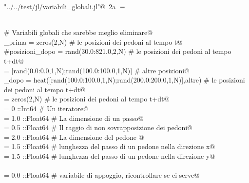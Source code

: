 \documentclass[]{article}
\begin{document}
\begin{flushleft} \small
\begin{minipage}{\linewidth} \label{scrap2}
\protect{}\verb@"../../test/jl/variabili_globali.jl"@\nobreak\ {\footnotesize 2a }$\equiv$
\vspace{-1ex}
\begin{list}{}{} \item
\mbox{}\verb@@\\
\mbox{}\verb@# Variabili globali che sarebbe meglio eliminare@\\
\mbox{}\verb@posizioni_prima = zeros(2,N)           # le posizioni dei pedoni al tempo t@\\
\mbox{}\verb@#posizioni_dopo = rand(30.0:821.0,2,N)    # le posizioni dei pedoni al tempo t+dt@\\
\mbox{}\verb@altre = [rand(0.0:0.0,1,N);rand(100.0:100.0,1,N)] # altre posizioni@\\
\mbox{}\verb@posizioni_dopo = hcat([rand(100.0:100.0,1,N);rand(200.0:200.0,1,N)],altre) # le posizioni dei pedoni al tempo t+dt@\\
\mbox{}\verb@velocita = zeros(2,N)                  # le posizioni dei pedoni al tempo t+dt@\\
\mbox{}\verb@k = 0 ::Int64                       # Un iteratore@\\
\mbox{}\verb@passo = 1.0 ::Float64                  # La dimensione di un passo@\\
\mbox{}\verb@raggio = 0.5 ::Float64                 # Il raggio di non sovrapposizione dei pedoni@\\
\mbox{}\verb@dimenpedone = 2.0 ::Float64                  # La dimensione del pedone @\\
\mbox{}\verb@scalax = 1.5 ::Float64                 # lunghezza del passo di un pedone nella direzione x@\\
\mbox{}\verb@scalay = 1.5 ::Float64                 # lunghezza del passo di un pedone nella direzione y@\\
\mbox{}\verb@@\\
\mbox{}\verb@mmm = 0.0 ::Float64                    # variabile di appoggio, ricontrollare se ci serve@\\
\mbox{}\verb@@{\NWsep}
\end{list}
\vspace{-2ex}
\end{minipage}\\[4ex]
\end{flushleft}
\end{document}
